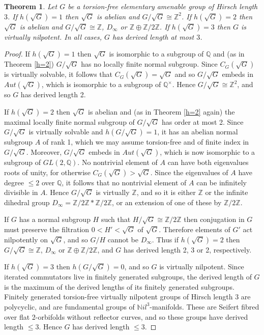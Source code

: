 \documentclass[10pt,a4paper]{amsart}
\newtheorem{theorem}{Theorem}
\renewcommand{\leq}{\leqslant}
\begin{document}
\begin{theorem}
\label{h=3}
Let $G$ be a torsion-free elementary amenable group of Hirsch length $3$.
If $h(\sqrt{G})=1$ then $\sqrt{G}$ is abelian and $G/\sqrt{G}\cong\mathbb{Z}^2$.
If $h(\sqrt{G})=2$ then $\sqrt{G}$ is abelian and $G/\sqrt{G}\cong\mathbb{Z}$, 
$D_\infty$ or $\mathbb{Z}\oplus\mathbb{Z}/2\mathbb{Z}$.
If $h(\sqrt{G})=3$ then $G$ is virtually nilpotent.
In all cases, $G$ has derived length at most $3$.
\end{theorem}

\begin{proof}
If $h(\sqrt{G})=1$ then $\sqrt{G}$ is isomorphic to a subgroup of $\mathbb{Q}$ 
and (as in Theorem \ref{h=2}) $G/\sqrt{G}$ has no locally finite normal subgroup.
Since $C_G(\sqrt{G})$ is virtually solvable,
it follows that $C_G(\sqrt{G})=\sqrt{G}$ and so 
$G/\sqrt{G}$ embeds in $Aut(\sqrt{G})$, 
which is isomorphic to a subgroup of $\mathbb{Q}^\times$.
Hence $G/\sqrt{G}\cong\mathbb{Z}^2$,
and so $G$ has derived length 2.

If $h(\sqrt{G})=2$ then $\sqrt{G}$ is abelian and (as in Theorem \ref{h=2} again)
the maximal locally finite normal subgroup of $G/\sqrt{G}$ has order at most 2.
Since $G/\sqrt{G}$ is virtually solvable  and $h(G/\sqrt{G})=1$,
it has an abelian normal subgroup $A$ of rank 1,
which we may assume torsion-free and of finite index in $G/\sqrt{G}$.
Moreover, $G/\sqrt{G}$ embeds in $Aut(\sqrt{G})$, 
which is now isomorphic to a subgroup of $GL(2,\mathbb{Q})$.
No nontrivial element of $A$ can have both eigenvalues roots of unity,
for otherwise $C_G(\sqrt{G})>\sqrt{G}$.
Since the eigenvalues of $A$ have degree $\leq2$ over $\mathbb{Q}$,
it follows that no nontrivial element of $A$ can be infinitely divisible in $A$.
Hence $G/\sqrt{G}$ is virtually $\mathbb{Z}$, 
and so it is either $\mathbb{Z}$ or the infinite dihedral group 
$D_\infty=\mathbb{Z}/2\mathbb{Z}*\mathbb{Z}/2\mathbb{Z}$,
or an extension of one of these by $\mathbb{Z}/2\mathbb{Z}$.

If $G$ has a normal subgroup $H$ such that 
$H/\sqrt{G}\cong\mathbb{Z}/2\mathbb{Z}$ then conjugation in $G$ 
must preserve the filtration $0<H'<\sqrt{G}$ of $\sqrt{G}$.
Therefore elements of $G'$ act nilpotently on $\sqrt{G}$,
and so $G/H$ cannot be $D_\infty$.
Thus if $h(\sqrt{G})=2$ then $G/\sqrt{G}\cong\mathbb{Z}$, 
$D_\infty$ or $\mathbb{Z}\oplus\mathbb{Z}/2\mathbb{Z}$,
and $G$ has derived length 2, 3 or 2, respectively.

If $h(\sqrt{G})=3$ then $h(G/\sqrt{G})=0$, and so $G$ is virtually nilpotent.
Since iterated commutators live in finitely generated subgroups, 
the derived length of $G$ is the maximum of the derived lengths of its finitely generated subgroups.
Finitely generated torsion-free virtually nilpotent groups of Hirsch length 3
are polycyclic, and are fundamental groups of $\mathbb{N}il^3$-manifolds.
These are Seifert fibred over flat 2-orbifolds without reflector curves,
and so these groups have derived length $\leq3$.
Hence $G$ has derived length $\leq3$.
\end{proof}
\end{document}
